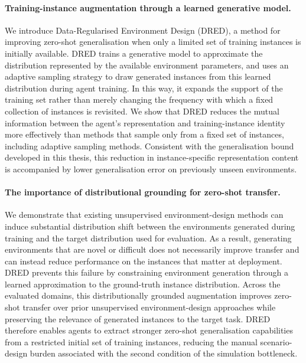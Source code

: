 \paragraph{Training-instance augmentation through a learned generative model.}
We introduce Data-Regularised Environment Design (\hbox{DRED}), a method for improving zero-shot generalisation when only a limited set of training instances is initially available. DRED trains a generative model to approximate the distribution represented by the available environment parameters, and uses an adaptive sampling strategy to draw generated instances from this learned distribution during agent training. In this way, it expands the support of the training set rather than merely changing the frequency with which a fixed collection of instances is revisited. We show that DRED reduces the mutual information between the agent's representation and training-instance identity more effectively than methods that sample only from a fixed set of instances, including adaptive sampling methods. Consistent with the generalisation bound developed in this thesis, this reduction in instance-specific representation content is accompanied by lower generalisation error on previously unseen environments.

\paragraph{The importance of distributional grounding for zero-shot transfer.}
We demonstrate that existing unsupervised environment-design methods can induce substantial distribution shift between the environments generated during training and the target distribution used for evaluation. As a result, generating environments that are novel or difficult does not necessarily improve transfer and can instead reduce performance on the instances that matter at deployment. DRED prevents this failure by constraining environment generation through a learned approximation to the ground-truth instance distribution. Across the evaluated domains, this distributionally grounded augmentation improves zero-shot transfer over prior unsupervised environment-design approaches while preserving the relevance of generated instances to the target task. DRED therefore enables agents to extract stronger zero-shot generalisation capabilities from a restricted initial set of training instances, reducing the manual scenario-design burden associated with the second condition of the simulation bottleneck.

